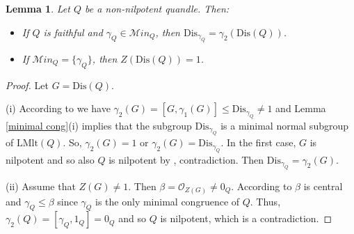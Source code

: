 \documentclass[a4paper, english, 9pt]{amsart}
\theoremstyle{plain}
\newtheorem{corollary}[theorem]{Corollary}
\newtheorem{lemma}[theorem]{Lemma}
\theoremstyle{definition}
\def\lmlt{\mathrm{LMlt}}
\def\dis{\mathrm{Dis}}
\def\comment#1{{\color{red} #1}}
\def\ma{\mathcal Min}
\begin{document}


		






\begin{lemma}\label{dis_gamma}
Let $Q$ be a non-nilpotent quandle. Then: 
\begin{itemize}
  \item[(i)] If $Q$ is faithful and $\gamma_Q\in \ma_Q$, then $\dis_{\gamma_Q}=\gamma_2(\dis(Q))$. 
    \item[(i)] If $\ma_Q=\{\gamma_Q\}$, then $Z(\dis(Q))=1$.
  
\end{itemize}
\end{lemma}

\begin{proof}
Let $G=\dis(Q)$. 


(i) According to \cite[Proposition 3.3(1)]{CP} we have $\gamma_2(G)=[G,\gamma_1(G)]\leq \dis_{\gamma_Q}\neq 1$ and Lemma \ref{minimal cong}(i) implies that the subgroup $\dis_{\gamma_Q}$ is a minimal normal subgroup of $\lmlt(Q)$. So, $\gamma_2(G)=1$ or $\gamma_2(G)=\dis_{\gamma_Q}$. In the first case, $G$ is nilpotent and so also $Q$ is nilpotent by \cite[Theorem 1.2(2)]{CP}, contradiction. Then $\dis_{\gamma_Q}=\gamma_2(G)$.

(ii) Assume that $Z(G)\neq 1$. Then $\beta=\mathcal{O}_{Z(G)}\neq 0_Q$. According to \cite[Lemma 5.12]{CP} $\beta$ is central and $\gamma_Q\leq \beta$ since $\gamma_Q$ is the only minimal congruence of $Q$. Thus, $\gamma_2(Q)=[\gamma_Q,1_Q]=0_Q$ and so $Q$ is nilpotent, which is a contradiction.
\end{proof}
\end{document}
